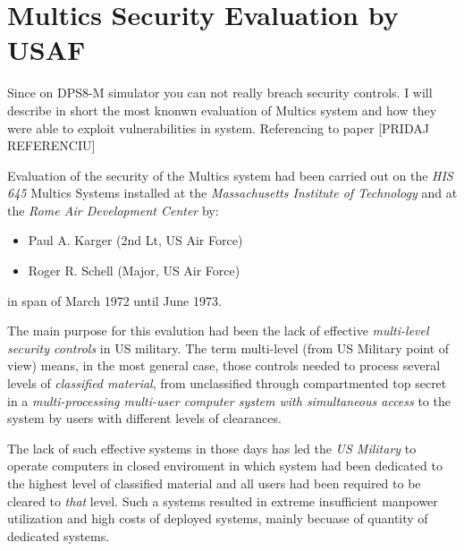 


\section{Multics Security Evaluation by USAF}

Since on DPS8-M simulator you can not really breach security controls. I will describe in short the most knonwn evaluation of 
Multics system and how they were able to exploit vulnerabilities in system. Referencing to paper [PRIDAJ REFERENCIU]

Evaluation of the security of the Multics system had been carried out on the \textit{HIS 645} 
Multics Systems installed at the \textit{Massachusetts Institute of Technology} and at the 
\textit{Rome Air Development Center} by:
\begin{itemize}
    \item Paul A. Karger (2nd Lt, US Air Force)
    \item Roger R. Schell (Major, US Air Force)
\end{itemize}
in span of March 1972 until June 1973.

The main purpose for this evalution had been the lack of effective \textit{multi-level security controls}
in US military. The term multi-level (from US Military point of view) means, in the most general case, 
those controls needed to process several levels of \textit{classified material}, from unclassified 
through compartmented top secret in a \textit{multi-processing multi-user computer system with simultaneous 
access} to the system by users with different levels of clearances.

The lack of such effective systems in those days has led the \textit{US Military} to operate computers
in closed enviroment in which system had been dedicated to the highest level of classified material and
all users had been required to be cleared to \textit{that} level.
Such a systems resulted in extreme insufficient manpower utilization and high costs of deployed systems,
mainly becuase of quantity of dedicated systems. 

